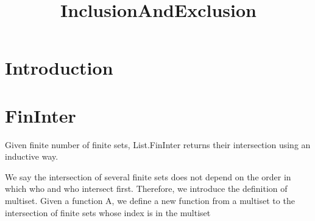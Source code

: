 \title{InclusionAndExclusion}




\maketitle


\tableofcontents

\nocite{*} %

\section{Introduction}


\section{FinInter}

\begin{definition}\label{List.FinInter}
  \leanok
          Given finite number of finite sets, List.FinInter returns their intersection using an inductive way.
\end{definition}

\begin{lemma}\label{List.eq_FinInter}

\end{lemma}

\begin{definition}\label{Multiset.FinInter}
          We say the intersection of several finite sets does not depend on the order in which who and who intersect first. Therefore, we introduce the definition of multiset. Given a function A, we define a new function from a multiset to the intersection of finite sets whose index is in the multiset
\end{definition}

\begin{lemma}\label{Multiset.eq_FinInter}
\end{lemma}

